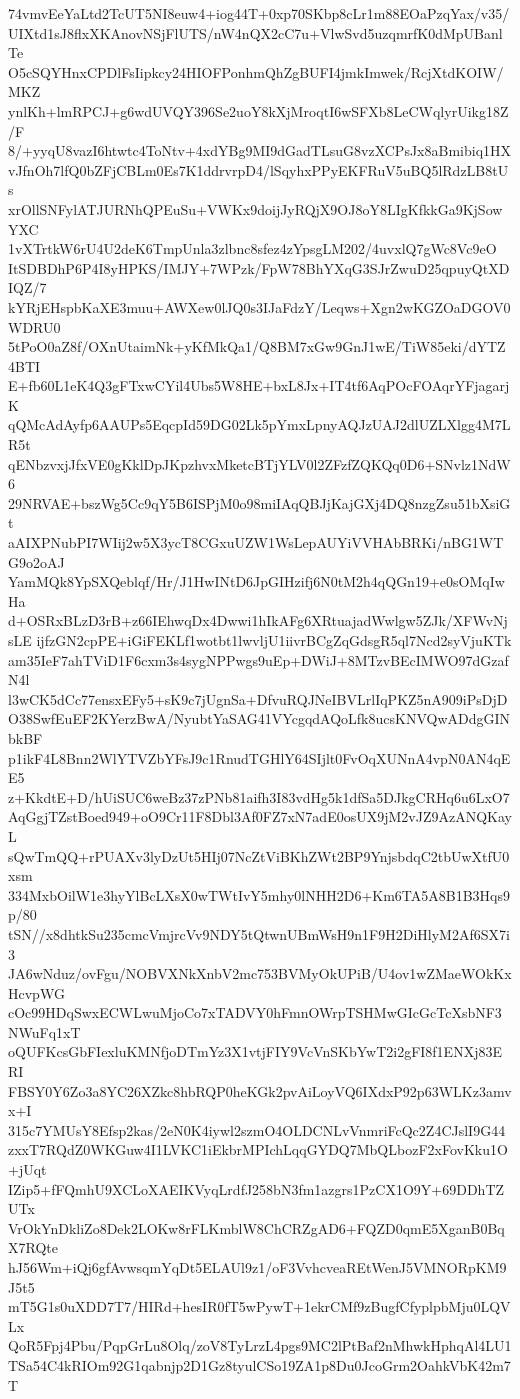 74vmvEeYaLtd2TcUT5NI8euw4+iog44T+0xp70SKbp8cLr1m88EOaPzqYax/v35/
UIXtd1sJ8flxXKAnovNSjFlUTS/nW4nQX2cC7u+VlwSvd5uzqmrfK0dMpUBanlTe
O5cSQYHnxCPDlFsIipkcy24HIOFPonhmQhZgBUFI4jmkImwek/RcjXtdKOIW/MKZ
ynlKh+lmRPCJ+g6wdUVQY396Se2uoY8kXjMroqtI6wSFXb8LeCWqlyrUikg18Z/F
8/+yyqU8vazI6htwtc4ToNtv+4xdYBg9MI9dGadTLsuG8vzXCPsJx8aBmibiq1HX
vJfnOh7lfQ0bZFjCBLm0Es7K1ddrvrpD4/lSqyhxPPyEKFRuV5uBQ5lRdzLB8tUs
xrOllSNFylATJURNhQPEuSu+VWKx9doijJyRQjX9OJ8oY8LIgKfkkGa9KjSowYXC
1vXTrtkW6rU4U2deK6TmpUnla3zlbnc8sfez4zYpsgLM202/4uvxlQ7gWc8Vc9eO
ItSDBDhP6P4I8yHPKS/IMJY+7WPzk/FpW78BhYXqG3SJrZwuD25qpuyQtXDIQZ/7
kYRjEHspbKaXE3muu+AWXew0lJQ0s3IJaFdzY/Leqws+Xgn2wKGZOaDGOV0WDRU0
5tPoO0aZ8f/OXnUtaimNk+yKfMkQa1/Q8BM7xGw9GnJ1wE/TiW85eki/dYTZ4BTI
E+fb60L1eK4Q3gFTxwCYil4Ubs5W8HE+bxL8Jx+IT4tf6AqPOcFOAqrYFjagarjK
qQMcAdAyfp6AAUPs5EqcpId59DG02Lk5pYmxLpnyAQJzUAJ2dlUZLXlgg4M7LR5t
qENbzvxjJfxVE0gKklDpJKpzhvxMketcBTjYLV0l2ZFzfZQKQq0D6+SNvlz1NdW6
29NRVAE+bszWg5Cc9qY5B6ISPjM0o98miIAqQBJjKajGXj4DQ8nzgZsu51bXsiGt
aAIXPNubPI7WIij2w5X3ycT8CGxuUZW1WsLepAUYiVVHAbBRKi/nBG1WTG9o2oAJ
YamMQk8YpSXQeblqf/Hr/J1HwINtD6JpGIHzifj6N0tM2h4qQGn19+e0sOMqIwHa
d+OSRxBLzD3rB+z66IEhwqDx4Dwwi1hIkAFg6XRtuajadWwlgw5ZJk/XFWvNjsLE
ijfzGN2cpPE+iGiFEKLf1wotbt1lwvljU1iivrBCgZqGdsgR5ql7Ncd2syVjuKTk
am35IeF7ahTViD1F6cxm3s4sygNPPwgs9uEp+DWiJ+8MTzvBEcIMWO97dGzafN4l
l3wCK5dCc77ensxEFy5+sK9c7jUgnSa+DfvuRQJNeIBVLrlIqPKZ5nA909iPsDjD
O38SwfEuEF2KYerzBwA/NyubtYaSAG41VYcgqdAQoLfk8ucsKNVQwADdgGINbkBF
p1ikF4L8Bnn2WlYTVZbYFsJ9c1RnudTGHlY64SIjlt0FvOqXUNnA4vpN0AN4qEE5
z+KkdtE+D/hUiSUC6weBz37zPNb81aifh3I83vdHg5k1dfSa5DJkgCRHq6u6LxO7
AqGgjTZstBoed949+oO9Cr11F8Dbl3Af0FZ7xN7adE0osUX9jM2vJZ9AzANQKayL
sQwTmQQ+rPUAXv3lyDzUt5HIj07NcZtViBKhZWt2BP9YnjsbdqC2tbUwXtfU0xsm
334MxbOilW1e3hyYlBcLXsX0wTWtIvY5mhy0lNHH2D6+Km6TA5A8B1B3Hqs9p/80
tSN//x8dhtkSu235cmcVmjrcVv9NDY5tQtwnUBmWsH9n1F9H2DiHlyM2Af6SX7i3
JA6wNduz/ovFgu/NOBVXNkXnbV2mc753BVMyOkUPiB/U4ov1wZMaeWOkKxHcvpWG
cOc99HDqSwxECWLwuMjoCo7xTADVY0hFmnOWrpTSHMwGIcGcTcXsbNF3NWuFq1xT
oQUFKcsGbFIexluKMNfjoDTmYz3X1vtjFIY9VcVnSKbYwT2i2gFI8f1ENXj83ERI
FBSY0Y6Zo3a8YC26XZkc8hbRQP0heKGk2pvAiLoyVQ6IXdxP92p63WLKz3amvx+I
315c7YMUsY8Efsp2kas/2eN0K4iywl2szmO4OLDCNLvVnmriFcQc2Z4CJslI9G44
zxxT7RQdZ0WKGuw4I1LVKC1iEkbrMPIchLqqGYDQ7MbQLbozF2xFovKku1O+jUqt
IZip5+fFQmhU9XCLoXAEIKVyqLrdfJ258bN3fm1azgrs1PzCX1O9Y+69DDhTZUTx
VrOkYnDkliZo8Dek2LOKw8rFLKmblW8ChCRZgAD6+FQZD0qmE5XganB0BqX7RQte
hJ56Wm+iQj6gfAvwsqmYqDt5ELAUl9z1/oF3VvhcveaREtWenJ5VMNORpKM9J5t5
mT5G1s0uXDD7T7/HIRd+hesIR0fT5wPywT+1ekrCMf9zBugfCfyplpbMju0LQVLx
QoR5Fpj4Pbu/PqpGrLu8Olq/zoV8TyLrzL4pgs9MC2lPtBaf2nMhwkHphqAl4LU1
TSa54C4kRIOm92G1qabnjp2D1Gz8tyulCSo19ZA1p8Du0JcoGrm2OahkVbK42m7T
